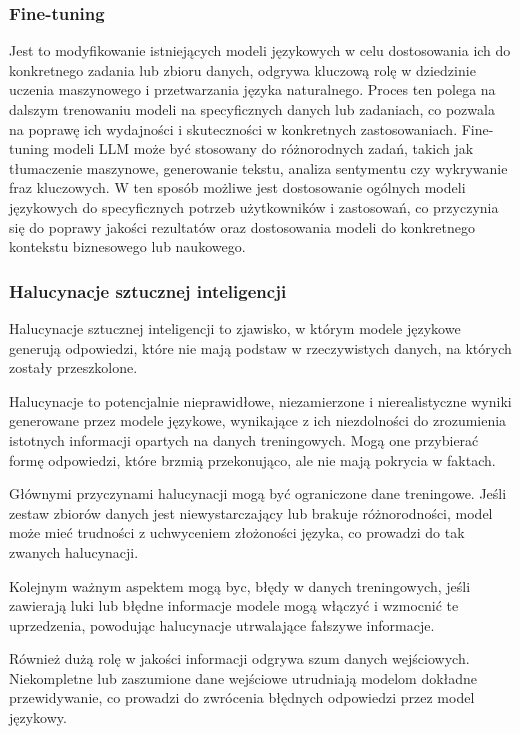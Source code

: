 \subsubsection{Fine-tuning}
Jest to modyfikowanie istniejących modeli językowych w celu dostosowania ich do konkretnego zadania lub zbioru danych, odgrywa kluczową rolę w dziedzinie uczenia maszynowego i przetwarzania języka naturalnego. Proces ten polega na dalszym trenowaniu modeli na specyficznych danych lub zadaniach, co pozwala na poprawę ich wydajności i skuteczności w konkretnych zastosowaniach. Fine-tuning modeli LLM może być stosowany do różnorodnych zadań, takich jak tłumaczenie maszynowe, generowanie tekstu, analiza sentymentu czy wykrywanie fraz kluczowych. W ten sposób możliwe jest dostosowanie ogólnych modeli językowych do specyficznych potrzeb użytkowników i zastosowań, co przyczynia się do poprawy jakości rezultatów oraz dostosowania modeli do konkretnego kontekstu biznesowego lub naukowego.

\subsubsection{Halucynacje sztucznej inteligencji}
Halucynacje sztucznej inteligencji to zjawisko, w którym modele językowe generują odpowiedzi, które nie mają podstaw w rzeczywistych danych, na których zostały przeszkolone.

Halucynacje to potencjalnie nieprawidłowe, niezamierzone i nierealistyczne wyniki generowane przez modele językowe, wynikające z ich niezdolności do zrozumienia istotnych informacji opartych na danych treningowych. Mogą one przybierać formę odpowiedzi, które brzmią przekonująco, ale nie mają pokrycia w faktach.

Głównymi przyczynami halucynacji mogą być ograniczone dane treningowe. Jeśli zestaw zbiorów danych jest niewystarczający lub brakuje różnorodności, model może mieć trudności z uchwyceniem złożoności języka, co prowadzi do tak zwanych halucynacji.

Kolejnym ważnym aspektem mogą byc, błędy w danych treningowych, jeśli zawierają luki lub błędne informacje modele mogą włączyć i wzmocnić te uprzedzenia, powodując halucynacje utrwalające fałszywe informacje.

Również dużą rolę w jakości informacji odgrywa szum danych wejściowych. Niekompletne lub zaszumione dane wejściowe utrudniają modelom dokładne przewidywanie, co prowadzi do zwrócenia błędnych odpowiedzi przez model językowy.

